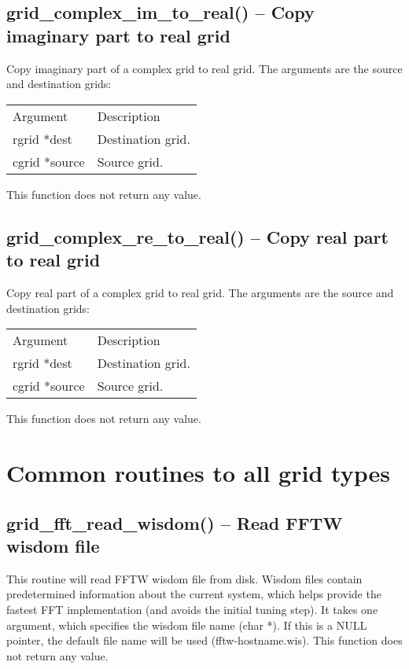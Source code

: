 \documentclass[12pt,letterpaper]{report}
\begin{document}
\subsection{grid\_complex\_im\_to\_real() -- Copy imaginary part to real grid}

Copy imaginary part of a complex grid to real grid. The arguments are the source and destination grids:
\begin{longtable}{p{} p{}}
Argument & Description\\
\cline{1-2}
rgrid *dest & Destination grid.\\
cgrid *source & Source grid.\\
\end{longtable}
\noindent
This function does not return any value.

\subsection{grid\_complex\_re\_to\_real() -- Copy real part to real grid}

Copy real part of a complex grid to real grid. The arguments are the source and destination grids:
\begin{longtable}{p{} p{}}
Argument & Description\\
\cline{1-2}
rgrid *dest & Destination grid.\\
cgrid *source & Source grid.\\
\end{longtable}
\noindent
This function does not return any value.

\section{Common routines to all grid types}

\subsection{grid\_fft\_read\_wisdom() -- Read FFTW wisdom file}

This routine will read FFTW wisdom file from disk. Wisdom files contain predetermined information about the current system, which helps provide the fastest FFT implementation (and avoids the initial tuning step). It takes one argument, which specifies the wisdom file name (char *). If this is a NULL pointer, the default file name will be used (fftw-hostname.wis). This function does not return any value.
\end{document}
